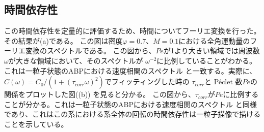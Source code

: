 \documentclass[/Users/ikedahajime/GitHub/reserch/master_report/thesis]{subfiles}
\begin{document}
\subsection{時間依存性}
この時間依存性を定量的に評価するため、時間についてフーリエ変換を行った。
その結果が(a)である。
この図は密度$\varphi=0.7、M=0.1$における全角運動量のフーリエ変換のスペクトルである。
この図から、$Pe$が1より大きい領域では周波数$\omega$が大きな領域において、そのスペクトルが
$\omega^{-2}$に比例していることがわかる。これは一粒子状態のABPにおける速度相関のスペクトル
と一致する。実際に、$C(\omega)=C_0/(1+(\tau_{corr}\omega)^2)$でフィッティングした時の
$\tau_{corr}$と Péclet 数$Pe$の関係をプロットした図((b))
を見ると分かる。%
この図から、$\tau_{corr}$が$ Pe$に比例することが分かる。これは一粒子状態のABPにおける速度相関のスペクトル%
と同様であり、これはこの系における系全体の回転の時間依存性は一粒子描像で描けることを示している。
\end{document}
